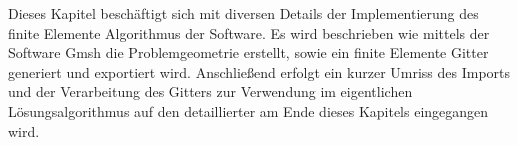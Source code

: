 Dieses Kapitel beschäftigt sich mit diversen Details der Implementierung des finite Elemente Algorithmus der Software. Es wird beschrieben wie mittels der Software Gmsh die Problemgeometrie erstellt, sowie ein finite Elemente Gitter generiert und exportiert wird. Anschließend erfolgt ein kurzer Umriss des Imports und der Verarbeitung des Gitters zur Verwendung im eigentlichen Lösungsalgorithmus auf den detaillierter am Ende dieses Kapitels eingegangen wird.